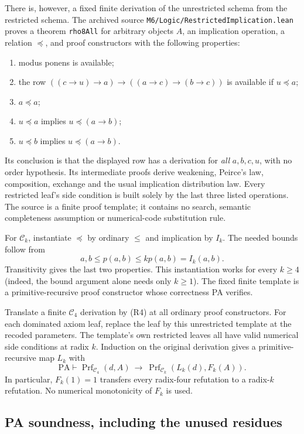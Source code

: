 There is, however, a fixed finite derivation of the unrestricted
schema from the restricted schema. The archived source
\texttt{M6/Logic/RestrictedImplication.lean} proves a theorem
\texttt{rho8All} for arbitrary objects $A$, an implication operation,
a relation $\preceq$, and proof constructors with the following
properties:
\begin{enumerate}
 \item modus ponens is available;
 \item the row $((c\to u)\to a)\to((a\to c)\to(b\to c))$
       is available if $u\preceq a$;
 \item $a\preceq a$;
 \item $u\preceq a$ implies $u\preceq(a\to b)$;
 \item $u\preceq b$ implies $u\preceq(a\to b)$.
\end{enumerate}
Its conclusion is that the displayed row has a derivation for
\emph{all} $a,b,c,u$, with no order hypothesis. Its intermediate
proofs derive weakening, Peirce's law, composition, exchange and the
usual implication distribution law. Every restricted leaf's side
condition is built solely by the last three listed operations.
The source is a finite proof template; it contains no search,
semantic completeness assumption or numerical-code substitution rule.

For $\mathcal C_k$, instantiate $\preceq$ by ordinary $\leq$ and
implication by $I_k$. The needed bounds follow from
\[
 a,b\leq p(a,b)\leq kp(a,b)=I_k(a,b).
\]
Transitivity gives the last two properties. This instantiation works
for every $k\geq4$ (indeed, the bound argument alone needs only
$k\geq1$). The fixed finite template is a primitive-recursive proof
constructor whose correctness PA verifies.

Translate a finite $\mathcal C_4$ derivation by (R4) at all ordinary
proof constructors. For each dominated axiom leaf, replace the leaf
by this unrestricted template at the recoded parameters. The
template's own restricted leaves all have valid numerical side
conditions at radix $k$. Induction on the original derivation gives
a primitive-recursive map $L_k$ with
\[
 \mathrm{PA}\vdash
 \operatorname{Prf}_{\mathcal C_4}(d,A)
 \ \longrightarrow\
 \operatorname{Prf}_{\mathcal C_k}(L_k(d),F_k(A)).        \tag{R6}
\]
In particular, $F_k(1)=1$ transfers every radix-four refutation to
a radix-$k$ refutation. No numerical monotonicity of $F_k$ is used.

\subsection{PA soundness, including the unused residues}

